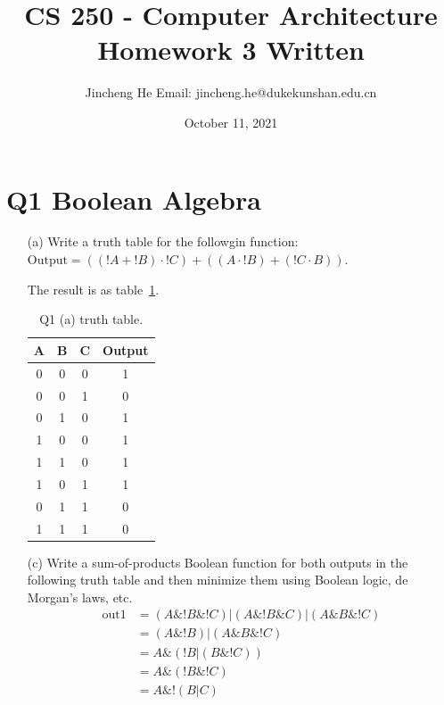 \documentclass{article}
\title{CS 250 - Computer Architecture \\ Homework 3 Written}
\author{Jincheng He Email: jincheng.he@dukekunshan.edu.cn}
\date{October 11, 2021}
\theoremstyle{remark}
\theoremstyle{definition}
\begin{document}
    \maketitle


    \section{Q1 Boolean Algebra}
    \begin{enumerate}
        \item[(a)] Write a truth table for the followgin function: $\text{Output} = \left( \left( !A + !B \right)\cdot !C \right) + \left( \left( A\cdot !B \right) + \left( !C\cdot B \right) \right)$.

        The result is as table~\ref{tab:Q1a_tt}.
        \begin{table}[!htbp]
            \centering
            \begin{tabular}{cccc}
                \toprule
                A & B & C & Output \\
                \midrule
                0 & 0 & 0 & 1      \\
                0 & 0 & 1 & 0      \\
                0 & 1 & 0 & 1      \\
                1 & 0 & 0 & 1      \\
                1 & 1 & 0 & 1      \\
                1 & 0 & 1 & 1      \\
                0 & 1 & 1 & 0      \\
                1 & 1 & 1 & 0      \\
                \bottomrule
            \end{tabular}
            \caption{Q1 (a) truth table.}
            \label{tab:Q1a_tt}
        \end{table}

        \item[(c)] Write a sum-of-products Boolean function for both outputs in the following truth table and then minimize them using Boolean logic, de Morgan's laws, etc.
        $$
        \begin{aligned}
            \text{out1} &= \left( A \& !B \& !C \right) | \left( A \& !B \& C \right) | \left( A \& B \& !C \right) \\
            &= \left( A \& !B \right) | \left( A \& B \& !C \right) \\
            &= A \& \left( !B | \left( B \& !C \right) \right) \\
            &= A \& \left( !B \& !C \right) \\
            &= A \& !\left( B | C \right)
        \end{aligned}
        $$


\end{enumerate}
\end{document}
